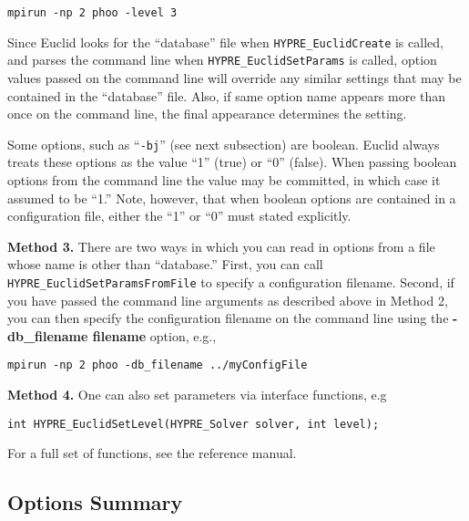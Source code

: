 \begin{display}
\begin{verbatim}
mpirun -np 2 phoo -level 3
\end{verbatim}
\end{display}

Since Euclid looks for the ``database'' file when 
{\tt HYPRE\_EuclidCreate} is called, and parses the command line 
when {\tt HYPRE\_EuclidSetParams} is called,
option values passed on the command line will override 
any similar settings that may be contained in the ``database'' file.
Also, if same option name appears more than once on the command 
line, the final appearance determines the setting.

Some options, such as ``{\tt -bj}'' (see next subsection) are boolean.
Euclid always treats these options as the value ``1'' (true)
or ``0'' (false).  
When passing boolean options from the command line
the value may be committed, in which case it assumed to be ``1.''
Note, however, that when boolean options are contained in a
configuration file, either the ``1'' or ``0'' must
stated explicitly.

{\bf Method 3.}
There are two ways in which you can read in options from a file
whose name is other than ``database.''
First, you can call {\tt HYPRE\_EuclidSetParamsFromFile}
to specify a configuration filename.
Second, if you have passed the command line arguments as 
described above in Method 2, 
you can then specify the configuration filename on the command
line using the {\bf -db\_filename filename} option, e.g.,

\begin{display}
\begin{verbatim}
mpirun -np 2 phoo -db_filename ../myConfigFile
\end{verbatim}
\end{display}

{\bf Method 4.}
One can also set parameters via interface functions, e.g
\begin{display}
\begin{verbatim}
int HYPRE_EuclidSetLevel(HYPRE_Solver solver, int level);
\end{verbatim}
\end{display}
For a full set of functions, see the reference manual.


\subsection{Options Summary}

